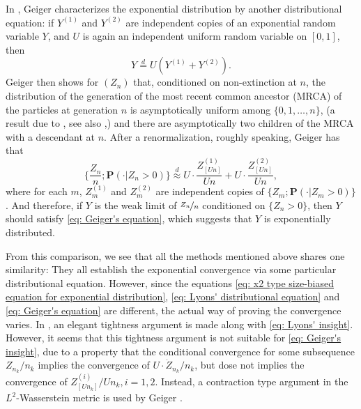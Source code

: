 \documentclass[12pt,a4paper]{amsart}
\numberwithin{equation}{section}
\begin{document}
In \cite{geiger2000new}, Geiger characterizes the exponential distribution by another
 distributional equation: if $Y^{(1)}$ and $Y^{(2)}$ are independent copies of an exponential random variable $Y$, and $U$ is again an independent uniform random variable on $[0,1]$, then 
\begin{equation}
\label{eq: Geiger's equation}
	Y	\overset{d} = U (Y^{(1)} + Y^{(2)}).
\end{equation}
	Geiger then shows for $(Z_n)$ that, conditioned on non-extinction at $n$, the distribution of the generation of the most recent common ancestor (MRCA) of the particles at generation $n$ is asymptotically uniform among $\{0,1,\dots,n\}$, (a result due to \cite{Zubkov1975}, see also \cite{geiger1999elementary},) and there are asymptotically two children of the MRCA with a descendant at $n$. 
	After a renormalization, roughly speaking, Geiger has that 
\begin{equation}
\label{eq: Geiger's insight}
	\big\{\frac{Z_n}{n} ; \mathbf P(  \cdot| Z_n > 0) \big\} 
	\overset{d}{\approx} U \cdot \frac{ Z^{(1)}_{[Un]}}{Un} + U \cdot \frac{ Z^{(2)}_{[Un]}}{Un} ,
\end{equation}
	where for each $m$, $Z_m^{(1)}$ and $Z_m^{(2)}$ are independent copies of $\{Z_m; \mathbf P(\cdot | Z_m > 0)\}$.
	And therefore, if $Y$ is the weak limit of $\nicefrac{Z_n}{n}$ conditioned on $\{Z_n > 0\}$, then $Y$ should satisfy \eqref{eq: Geiger's equation}, which suggests that $Y$ is exponentially distributed. 
	
	From this comparison, we see that all the methods mentioned above shares one similarity: They all establish the exponential convergence via some particular distributional equation. 
	However, since the equations \eqref{eq: x2 type size-biased equation for exponential distribution}, \eqref{eq: Lyons' distributional equation} and \eqref{eq: Geiger's equation} are different, the actual way of proving the convergence varies.
	In \cite{lyons1995conceptual}, an elegant tightness argument is made along with \eqref{eq: Lyons' insight}. 
	However, it seems that this tightness argument is not suitable for \eqref{eq: Geiger's insight}, due to a property that the conditional convergence for some subsequence 
$Z_{n_k}/n_k$ implies the convergence of $U \cdot \dot Z_{n_k}/n_k$, but dose not implies the convergence of $Z^{(i)}_{[Un_k]}/Un_k, i=1, 2$. 
Instead, a contraction type argument in the $L^2$-Wasserstein metric is used by Geiger \cite{geiger2000new}.
	
\end{document}
